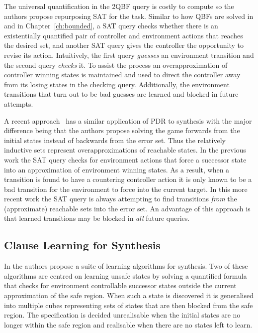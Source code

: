 The universal quantification in the 2QBF query is costly to compute so the authors propose repurposing SAT for the task. Similar to how QBFs are solved in \cite{Janota12} and in Chapter~\ref{ch:bounded}, a SAT query checks whether there is an existentially quantified pair of controller and environment actions that reaches the desired set, and another SAT query gives the controller the opportunity to revise its action. Intuitively, the first query \emph{guesses} an environment transition and the second query \emph{checks} it. To assist the process an overapproximation of controller winning states is maintained and used to direct the controller away from its losing states in the checking query. Additionally, the environment transitions that turn out to be bad guesses are learned and blocked in future attempts.

A recent approach~\cite{Chiang15} has a similar application of PDR to synthesis with the major difference being that the authors propose solving the game forwards from the initial states instead of backwards from the error set. Thus the relatively inductive sets represent overapproximations of reachable states. In the previous work the SAT query checks for environment actions that force a successor state into an approximation of environment winning states. As a result, when a transition is found to have a countering controller action it is only known to be a bad transition for the environment to force into the current target. In this more recent work the SAT query is always attempting to find transitions \emph{from} the (approximate) reachable sets into the error set. An advantage of this approach is that learned transitions may be blocked in \emph{all} future queries.

\subsection{Clause Learning for Synthesis}

In \cite{Bloem14} the authors propose a suite of learning algorithms for synthesis. Two of these algorithms are centred on learning unsafe states by solving a quantified formula that checks for environment controllable successor states outside the current approximation of the safe region. When such a state is discovered it is generalised into multiple cubes representing sets of states that are then blocked from the safe region. The specification is decided unrealisable when the initial states are no longer within the safe region and realisable when there are no states left to learn. 

